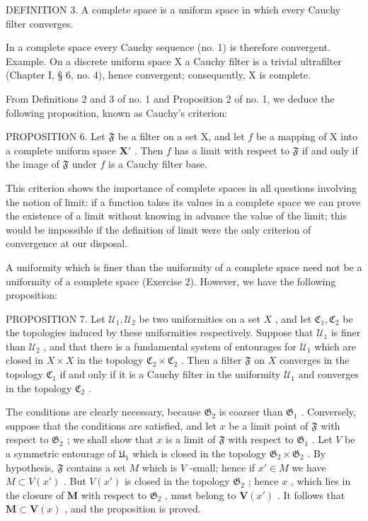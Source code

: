 DEFINITION 3. A complete space is a uniform space in which every Cauchy filter converges.

In a complete space every Cauchy sequence (no. 1) is therefore convergent. Example. On a discrete uniform space X a Cauchy filter is a trivial ultrafilter (Chapter I, § 6, no. 4), hence convergent; consequently, X is complete.

From Definitions 2 and 3 of no. 1 and Proposition 2 of no. 1, we deduce the following proposition, known as Cauchy's criterion:

PROPOSITION 6. Let \(\mathfrak{F}\) be a filter on a set X, and let \(f\) be a mapping of X into a complete uniform space \(\mathbf{X}'\) . Then \(f\) has a limit with respect to \(\mathfrak{F}\) if and only if the image of \(\mathfrak{F}\) under \(f\) is a Cauchy filter base.

This criterion shows the importance of complete spaces in all questions involving the notion of limit: if a function takes its values in a complete space we can prove the existence of a limit without knowing in advance the value of the limit; this would be impossible if the definition of limit were the only criterion of convergence at our disposal.

A uniformity which is finer than the uniformity of a complete space need not be a uniformity of a complete space (Exercise 2). However, we have the following proposition:

PROPOSITION 7. Let \(\mathcal{U}_1, \mathcal{U}_2\) be two uniformities on a set \(X\) , and let \(\mathfrak{C}_1, \mathfrak{C}_2\) be the topologies induced by these uniformities respectively. Suppose that \(\mathcal{U}_1\) is finer than \(\mathcal{U}_2\) , and that there is a fundamental system of entourages for \(\mathcal{U}_1\) which are closed in \(X \times X\) in the topology \(\mathfrak{C}_2 \times \mathfrak{C}_2\) . Then a filter \(\mathfrak{F}\) on \(X\) converges in the topology \(\mathfrak{C}_1\) if and only if it is a Cauchy filter in the uniformity \(\mathcal{U}_1\) and converges in the topology \(\mathfrak{C}_2\) .

The conditions are clearly necessary, because \(\mathfrak{G}_2\) is coarser than \(\mathfrak{G}_1\) . Conversely, suppose that the conditions are satisfied, and let \(x\) be a limit point of \(\mathfrak{F}\) with respect to \(\mathfrak{G}_2\) ; we shall show that \(x\) is a limit of \(\mathfrak{F}\) with respect to \(\mathfrak{G}_1\) . Let \(V\) be a symmetric entourage of \(\mathfrak{U}_1\) which is closed in the topology \(\mathfrak{G}_2 \times \mathfrak{G}_2\) . By hypothesis, \(\mathfrak{F}\) contains a set \(M\) which is \(V\) -small; hence if \(x' \in M\) we have \(M \subset V(x')\) . But \(V(x')\) is closed in the topology \(\mathfrak{G}_{2}\) ; hence \(x\) , which lies in the closure of \(\mathbf{M}\) with respect to \(\mathfrak{G}_{2}\) , must belong to \(\mathbf{V}(x')\) . It follows that \(\mathbf{M} \subset \mathbf{V}(x)\) , and the proposition is proved.

